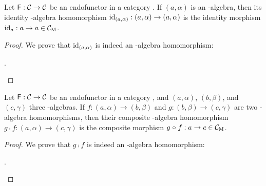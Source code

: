 \begin{definition}

  \label{def:identity-algebra-homomorphism}

  Let $\mathsf{F}: \mathcal{C} \to \mathcal{C}$ be an endofunctor in a category
  . If $(a,\alpha)$ is an -algebra, then its identity
  -algebra homomorphism $\operatorname{id}_{(a,\alpha)}: (a,\alpha) \to
  (a,\alpha)$ is the identity morphism $\operatorname{id}_{a}: a \to a \in
  \mathcal{C}_{\operatorname{M}}$.

  \begin{proof}
    We prove that $\operatorname{id}_{(a,\alpha)}$ is indeed an -algebra
    homomorphism:
    \begin{steps}
        \eqby{\eqref{eq:functor-identity}}
      .
    \end{steps}
  \end{proof}
\end{definition}

\begin{definition}

  \label{def:composite-algebra-homomorphism}

  Let $\mathsf{F}: \mathcal{C} \to \mathcal{C}$ be an endofunctor in a category
  , and $(a,\alpha)$, $(b,\beta)$, and $(c,\gamma)$ three
  -algebras. If $f: (a,\alpha) \to (b,\beta)$ and $g:
  (b,\beta) \to (c,\gamma)$ are two -algebra homomorphisms,
  then their composite -algebra homomorphism $g \comp f:
  (a,\alpha) \to (c,\gamma)$ is the composite morphism $g \mathrel{\circ} f: a
  \to c \in \mathcal{C}_{\operatorname{M}}$.

  \begin{proof}
    We prove that $g \comp f$ is indeed an -algebra
    homomorphism:
    \begin{steps}
        \eqby{\eqref{eq:functor-composition}}
        \eqby{\eqref{eq:algebra-homomorphism}}
      .
    \end{steps}
  \end{proof}

\end{definition}

